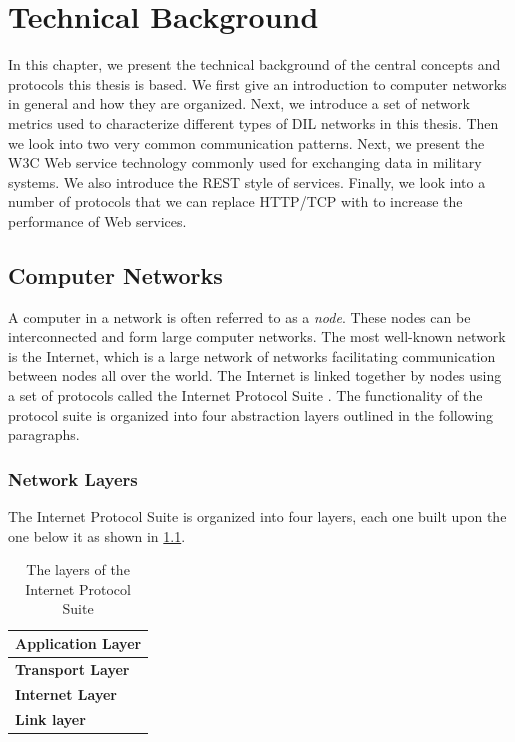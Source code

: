 \chapter{Technical Background}
\label{chapter:background}

In this chapter, we present the technical background of the central concepts and
protocols this thesis is based. We first give an introduction to computer
networks in general and how they are organized. Next, we introduce a set of
network metrics used to characterize different types of DIL networks in this
thesis. Then we look into two very common communication patterns. Next, we
present the W3C Web service technology commonly used for exchanging data in
military systems. We also introduce the REST style of services. Finally, we look
into a number of protocols that we can replace HTTP/TCP with to increase the
performance of Web services.


\section{Computer Networks}

A computer in a network is often referred to as a \textit{node}. These nodes can
be interconnected and form large computer networks. The most well-known network
is the Internet, which is a large network of networks facilitating communication
between nodes all over the world. The Internet is linked together by nodes using
a set of protocols called the Internet Protocol Suite \cite{rfc-1122}. The
functionality of the protocol suite is organized into four abstraction layers
outlined in the following paragraphs.

\subsection{Network Layers}

The Internet Protocol Suite is organized into four layers, each one built upon
the one below it as shown in \cref{figure-network-layers}.

\begin{table}[h]
\begin{tabularx}{0.5\textwidth}{| X |}
\hline
  \textbf{Application Layer} \\ \hline
  \textbf{Transport Layer} \\ \hline
  \textbf{Internet Layer} \\ \hline
  \textbf{Link layer} \\ \hline
\end{tabularx}
\caption{The layers of the Internet Protocol Suite}
\label{figure-network-layers}
\end{table}

